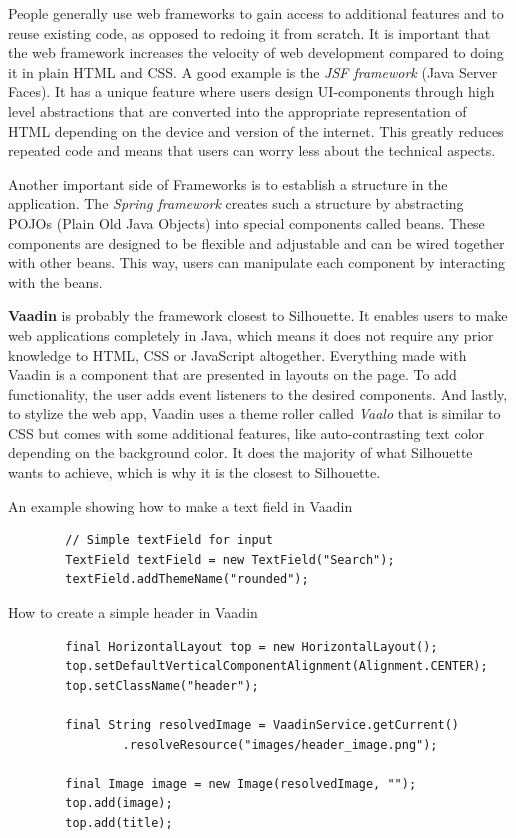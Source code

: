 \documentclass[12pt]{article}
\begin{document}
People generally use web frameworks to gain access to additional features and to reuse existing code, as opposed to redoing it from scratch. It is important that the web framework increases the velocity of web development compared to doing it in plain HTML and CSS. A good example is the \textit{JSF framework} (Java Server Faces). It has a unique feature where users design UI-components through high level abstractions that are converted into the appropriate representation of HTML depending on the device and version of the internet. This greatly reduces repeated code and means that users can worry less about the technical aspects.

Another important side of Frameworks is to establish a structure in the application. The \textit{Spring framework} creates such a structure by abstracting POJOs (Plain Old Java Objects) into special components called beans. These components are designed to be flexible and adjustable and can be wired together with other beans. This way, users can manipulate each component by interacting with the beans. 

\textbf{Vaadin} is probably the framework closest to Silhouette. It enables users to make web applications completely in Java, which means it does not require any prior knowledge to HTML, CSS or JavaScript altogether. Everything made with Vaadin is a component that are presented in layouts on the page. To add functionality, the user adds event listeners to the desired components. And lastly, to stylize the web app, Vaadin uses a theme roller called \textit{Vaalo} that is similar to CSS but comes with some additional features, like auto-contrasting text color depending on the background color. It does the majority of what Silhouette wants to achieve, which is why it is the closest to Silhouette.

\begin{shaded}
    An example showing how to make a text field in Vaadin
    \begin{lstlisting}
        // Simple textField for input
        TextField textField = new TextField("Search");
        textField.addThemeName("rounded");
    \end{lstlisting}

    How to create a simple header in Vaadin
    \begin{lstlisting}
        final HorizontalLayout top = new HorizontalLayout();
        top.setDefaultVerticalComponentAlignment(Alignment.CENTER);
        top.setClassName("header");

        final String resolvedImage = VaadinService.getCurrent()
                .resolveResource("images/header_image.png");

        final Image image = new Image(resolvedImage, "");
        top.add(image);
        top.add(title);


    \end{lstlisting}


\end{shaded}
\end{document}

